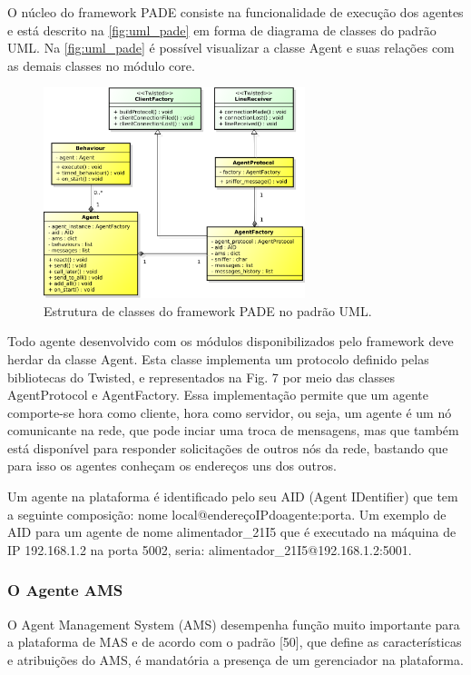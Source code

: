 \documentclass[journal]{IEEEtran}
\begin{document}
O núcleo do framework PADE consiste na funcionalidade de execução dos agentes e está descrito na \autoref{fig:uml_pade} em forma de diagrama de classes do padrão UML. Na \autoref{fig:uml_pade} é possível visualizar a classe Agent e suas relações com as demais classes no módulo core.

\begin{figure}[!htb]
    \centering
    \includegraphics[width=3.0in]{Figuras/Core.eps}
    \caption{\label{fig:uml_pade} Estrutura de classes do framework PADE no padrão UML.}
\end{figure}

Todo agente desenvolvido com os módulos disponibilizados pelo framework deve herdar da classe Agent. Esta classe implementa um protocolo definido pelas bibliotecas do Twisted, e representados na Fig. 7 por meio das classes AgentProtocol e AgentFactory. Essa implementação permite que um agente comporte-se hora como cliente, hora como servidor, ou seja, um agente é um nó comunicante na rede, que pode inciar uma troca de mensagens, mas que também está disponível para responder solicitações de outros nós da rede, bastando que para isso os agentes conheçam os endereços uns dos outros.

Um agente na plataforma é identificado pelo seu AID (Agent IDentifier) que tem a seguinte composição:  nome local@endereçoIPdoagente:porta. Um exemplo de AID para um agente de nome alimentador\_21I5 que é executado na máquina de IP 192.168.1.2 na porta 5002, seria: alimentador\_21I5@192.168.1.2:5001.

\subsubsection{O Agente AMS}

O Agent Management System (AMS) desempenha função muito importante para a plataforma de MAS e de acordo com o padrão [50], que define as características e atribuições do AMS, é mandatória a presença de um gerenciador na plataforma.
\end{document}
